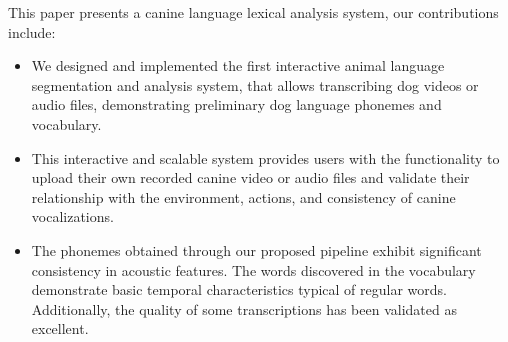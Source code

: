 This paper presents a canine language lexical analysis system, our contributions include:
\begin{itemize}
	\item We designed and implemented the first interactive animal language segmentation and analysis system, that allows transcribing dog videos or audio files, demonstrating preliminary dog language phonemes and vocabulary.
	\item This interactive and scalable system provides users with the functionality to upload their own recorded canine video or audio files and validate their relationship with the environment, actions, and consistency of canine vocalizations.
	\item The phonemes obtained through our proposed pipeline exhibit significant consistency in acoustic features. The words discovered in the vocabulary demonstrate basic temporal characteristics typical of regular words. Additionally, the quality of some transcriptions has been validated as excellent.
\end{itemize}
